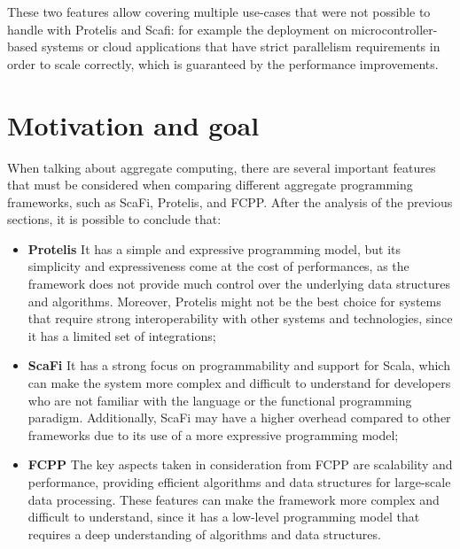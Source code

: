 These two features allow covering multiple use-cases that were not possible to handle with Protelis and Scafi: for example the deployment on microcontroller-based systems or cloud applications that have strict parallelism requirements in order to scale correctly, which is guaranteed by the performance improvements.

\section{Motivation and goal}
When talking about aggregate computing, there are several important features that must be considered when comparing different aggregate programming frameworks, such as ScaFi, Protelis, and FCPP.\newline
After the analysis of the previous sections, it is possible to conclude that:
\begin{itemize}
    \item \textbf{Protelis}\newline
    It has a simple and expressive programming model, but its simplicity and expressiveness come at the cost of performances, as the framework does not provide much control over the underlying data structures and algorithms. Moreover, Protelis might not be the best choice for systems that require strong interoperability with other systems and technologies, since it has a limited set of integrations;
    \item \textbf{ScaFi}\newline
    It has a strong focus on programmability and support for Scala, which can make the system more complex and difficult to understand for developers who are not familiar with the language or the functional programming paradigm. Additionally, ScaFi may have a higher overhead compared to other frameworks due to its use of a more expressive programming model;
    \item \textbf{FCPP}\newline
    The key aspects taken in consideration from FCPP are scalability and performance, providing efficient algorithms and data structures for large-scale data processing. These features can make the framework more complex and difficult to understand, since it has a low-level programming model that requires a deep understanding of algorithms and data structures.
\end{itemize}

